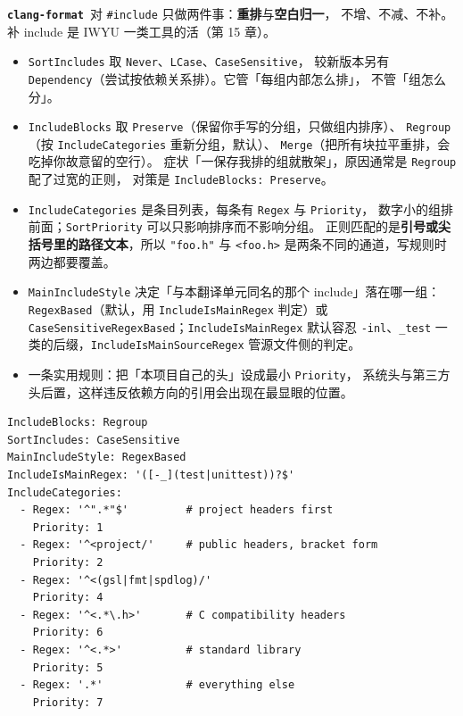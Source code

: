 \documentclass[12pt,a4paper,fontset=fandol]{ctexbook}
\newcommand{\Bk}{\discretionary{}{}{}}
\newcommand{\Lib}[1]{\textbf{\texttt{#1}}}
\newcommand{\Fmt}{\Lib{clang-format}}
\begin{document}
\Fmt\ 对 \texttt{\#include} 只做两件事：\textbf{重排}与\textbf{空白归一}，
不增、不减、不补。补 include 是 IWYU 一类工具的活（第 15 章）。

\begin{itemize}
  \item \texttt{SortIncludes} 取 \texttt{Never}、\texttt{LCase}、\texttt{CaseSensitive}，
    较新版本另有 \texttt{Dependency}（尝试按依赖关系排）。它管「每组内部怎么排」，
    不管「组怎么分」。
  \item \texttt{IncludeBlocks} 取 \texttt{Preserve}（保留你手写的分组，只做组内排序）、
    \texttt{Regroup}（按 \texttt{IncludeCategories} 重新分组，默认）、
    \texttt{Merge}（把所有块拉平重排，会吃掉你故意留的空行）。
    症状「一保存我排的组就散架」，原因通常是 \texttt{Regroup} 配了过宽的正则，
    对策是 \texttt{IncludeBlocks: Preserve}。
  \item \texttt{IncludeCategories} 是条目列表，每条有 \texttt{Regex} 与 \texttt{Priority}，
    数字小的组排前面；\texttt{SortPriority} 可以只影响排序而不影响分组。
    正则匹配的是\textbf{引号或尖括号里的路径文本}，所以 \texttt{"foo.h"} 与
    \texttt{<foo.h>} 是两条不同的通道，写规则时两边都要覆盖。
  \item \texttt{Main{\Bk}Include{\Bk}Style} 决定「与本翻译单元同名的那个 include」落在哪一组：
    \texttt{RegexBased}（默认，用 \texttt{Include\Bk Is{\Bk}Main{\Bk}Regex} 判定）或
    \texttt{Case{\Bk}Sensitive\Bk Regex{\Bk}Based}；\texttt{Include\Bk Is{\Bk}Main{\Bk}Regex} 默认容忍
    \texttt{-inl}、\texttt{\_test} 一类的后缀，\texttt{Include\Bk Is{\Bk}Main{\Bk}Source{\Bk}Regex}
    管源文件侧的判定。
  \item 一条实用规则：把「本项目自己的头」设成最小 \texttt{Priority}，
    系统头与第三方头后置，这样违反依赖方向的引用会出现在最显眼的位置。
\end{itemize}

\begin{lstlisting}[style=yamlstyle,caption={一份四组的 include 排序配置},label={lst:ch09-include}]
IncludeBlocks: Regroup
SortIncludes: CaseSensitive
MainIncludeStyle: RegexBased
IncludeIsMainRegex: '([-_](test|unittest))?$'
IncludeCategories:
  - Regex: '^".*"$'         # project headers first
    Priority: 1
  - Regex: '^<project/'     # public headers, bracket form
    Priority: 2
  - Regex: '^<(gsl|fmt|spdlog)/'
    Priority: 4
  - Regex: '^<.*\.h>'       # C compatibility headers
    Priority: 6
  - Regex: '^<.*>'          # standard library
    Priority: 5
  - Regex: '.*'             # everything else
    Priority: 7
\end{lstlisting}
\end{document}
